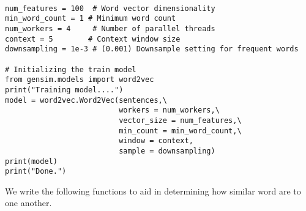 \documentclass[12pt, letterpaper]{article}
\begin{document}
\begin{mdframed}[backgroundcolor=shadecolor]
\begin{verbatim}

num_features = 100  # Word vector dimensionality
min_word_count = 1 # Minimum word count
num_workers = 4     # Number of parallel threads
context = 5        # Context window size
downsampling = 1e-3 # (0.001) Downsample setting for frequent words

# Initializing the train model
from gensim.models import word2vec
print("Training model....")
model = word2vec.Word2Vec(sentences,\
                          workers = num_workers,\
                          vector_size = num_features,\
                          min_count = min_word_count,\
                          window = context,
                          sample = downsampling)
print(model)
print("Done.")
\end{verbatim}
\end{mdframed}

We write the following functions to aid in determining how similar word are to one another.
\end{document}
